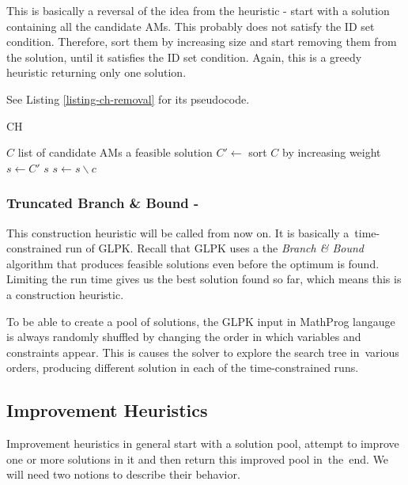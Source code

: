 This is basically a reversal of the idea from the  heuristic - start with a solution containing all the candidate AMs. This probably does not satisfy the ID set condition. Therefore, sort them by increasing size and start removing them from the solution, until it satisfies the ID set condition. Again, this is a greedy heuristic returning only one solution.

See Listing \ref{listing-ch-removal} for its pseudocode.

\begin{algorithm}
\caption{ CH}
\label{listing-ch-removal}
\begin{algorithmic}
\REQUIRE $C$ list of candidate AMs
\ENSURE a feasible solution
\STATE $C' \gets $ sort $C$ by increasing weight
\STATE $s \gets C'$
    \RETURN $s$
  \ENDIF
  \STATE $s \gets s \backslash c$
\ENDFOR
\end{algorithmic}
\end{algorithm}

\subsubsection{Truncated Branch \& Bound - }

This construction heuristic will be called  from now on. It is basically a~time-constrained run of GLPK. Recall that GLPK uses a the \textit{Branch \& Bound} algorithm that produces feasible solutions even before the optimum is found. Limiting the run time gives us the best solution found so far, which means this is a construction heuristic.

To be able to create a pool of solutions, the GLPK input in MathProg langauge is always randomly shuffled by changing the order in which variables and constraints appear. This is causes the solver to explore the search tree in~various orders, producing different solution in each of the time-constrained runs.

\subsection{Improvement Heuristics}
\label{section-mip-ihs}


Improvement heuristics in general start with a solution pool, attempt to improve one or more solutions in it and then return this improved pool in~the~end. We will need two notions to describe their behavior.

